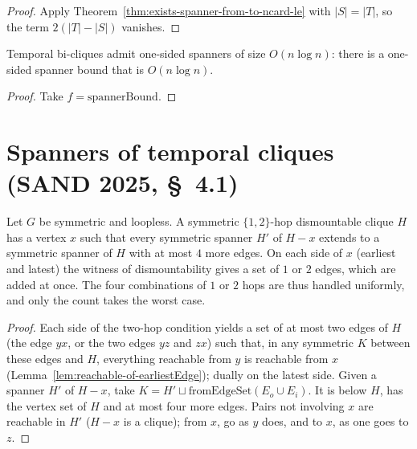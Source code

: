 \begin{proof}
  \leanok
  Apply Theorem~\ref{thm:exists-spanner-from-to-ncard-le} with $|S| = |T|$, so the term $2(|T|-|S|)$ vanishes.
\end{proof}

\begin{theorem}
  \label{thm:exists-isBigO-one-sided-spanner-bound}
  \leanok
  Temporal bi-cliques admit one-sided spanners of size $O(n \log n)$: there is
  a one-sided spanner bound that is $O(n \log n)$.
\end{theorem}

\begin{proof}
  \leanok
  Take $f = \mathrm{spannerBound}$.
\end{proof}

\section*{Spanners of temporal cliques (SAND 2025, \S~4.1)}

\begin{theorem}
  \label{thm:spanner-of-two-hop-dismountable}
  \leanok
  Let $G$ be symmetric and loopless. A symmetric $\{1,2\}$-hop dismountable
  clique $H$ has a vertex $x$ such that every symmetric spanner $H'$ of $H - x$
  extends to a symmetric spanner of $H$ with at most $4$ more edges.
  On each side of $x$ (earliest and latest) the witness of dismountability
  gives a set of $1$ or $2$ edges, which are added at once. The four
  combinations of $1$ or $2$ hops are thus handled uniformly, and only the
  count takes the worst case.
\end{theorem}

\begin{proof}
  \leanok
  Each side of the two-hop condition yields a set of at most two edges of $H$ (the edge $yx$, or the two edges $yz$ and $zx$) such that, in any symmetric $K$ between these edges and $H$, everything reachable from $y$ is reachable from $x$ (Lemma~\ref{lem:reachable-of-earliestEdge}); dually on the latest side. Given a spanner $H'$ of $H - x$, take $K = H' \sqcup \mathrm{fromEdgeSet}(E_o \cup E_i)$. It is below $H$, has the vertex set of $H$ and at most four more edges. Pairs not involving $x$ are reachable in $H'$ ($H - x$ is a clique); from $x$, go as $y$ does, and to $x$, as one goes to $z$.
\end{proof}

